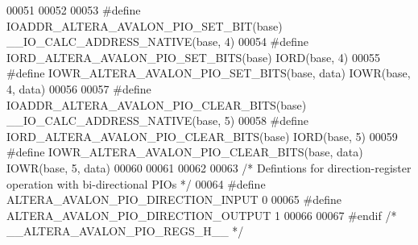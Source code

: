 \begin{DoxyCode}
00051 
00052 
00053 \textcolor{preprocessor}{#define IOADDR\_ALTERA\_AVALON\_PIO\_SET\_BIT(base)       \_\_IO\_CALC\_ADDRESS\_NATIVE(base, 4)}
00054 \textcolor{preprocessor}{#define IORD\_ALTERA\_AVALON\_PIO\_SET\_BITS(base)         IORD(base, 4) }
00055 \textcolor{preprocessor}{#define IOWR\_ALTERA\_AVALON\_PIO\_SET\_BITS(base, data)   IOWR(base, 4, data)}
00056     
00057 \textcolor{preprocessor}{#define IOADDR\_ALTERA\_AVALON\_PIO\_CLEAR\_BITS(base)       \_\_IO\_CALC\_ADDRESS\_NATIVE(base, 5)}
00058 \textcolor{preprocessor}{#define IORD\_ALTERA\_AVALON\_PIO\_CLEAR\_BITS(base)         IORD(base, 5) }
00059 \textcolor{preprocessor}{#define IOWR\_ALTERA\_AVALON\_PIO\_CLEAR\_BITS(base, data)   IOWR(base, 5, data)}
00060      
00061 
00062  
00063 \textcolor{comment}{/* Defintions for direction-register operation with bi-directional PIOs */}
00064 \textcolor{preprocessor}{#define ALTERA\_AVALON\_PIO\_DIRECTION\_INPUT  0}
00065 \textcolor{preprocessor}{#define ALTERA\_AVALON\_PIO\_DIRECTION\_OUTPUT 1}
00066 
00067 \textcolor{preprocessor}{#endif }\textcolor{comment}{/* \_\_ALTERA\_AVALON\_PIO\_REGS\_H\_\_ */}\textcolor{preprocessor}{}
\end{DoxyCode}
